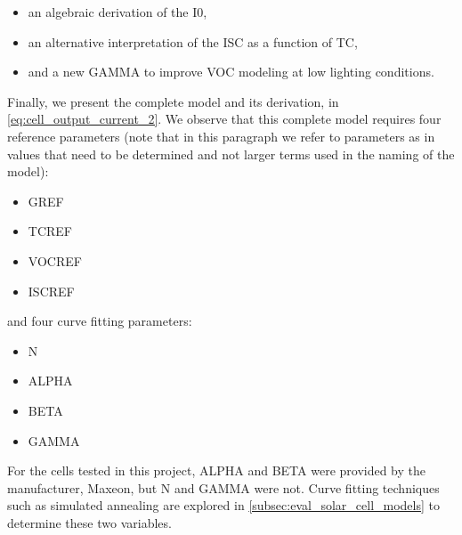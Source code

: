 \begin{itemize}
    \item an algebraic derivation of the \acf{I0},
    \item an alternative interpretation of the \acf{ISC} as
    a function of \acf{TC},
    \item and a new \acf{GAMMA} to improve \acf{VOC} modeling at low lighting
    conditions.
\end{itemize}

Finally, we present the complete model and its derivation, in
\autoref{eq:cell_output_current_2}. We observe that this complete model requires
four reference parameters (note that in this paragraph we refer to parameters as
in values that need to be determined and not larger terms used in the naming of
the model):

\begin{itemize}
    \item \acf{GREF}
    \item \acf{TCREF}
    \item \acf{VOCREF}
    \item \acf{ISCREF}
\end{itemize}

and four curve fitting parameters:

\begin{itemize}
    \item \acf{N}
    \item \acf{ALPHA}
    \item \acf{BETA}
    \item \acf{GAMMA}
\end{itemize}

For the cells tested in this project, \ac{ALPHA} and \ac{BETA} were provided
by the manufacturer, Maxeon, but \ac{N} and \ac{GAMMA} were not. Curve fitting
techniques such as simulated annealing are explored in
\autoref{subsec:eval_solar_cell_models} to determine these two variables.



